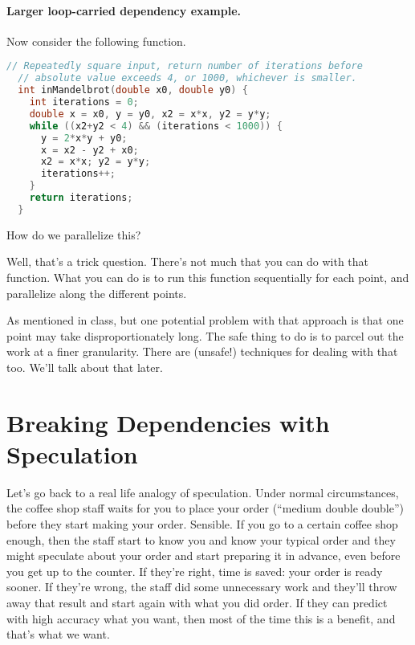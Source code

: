 \paragraph{Larger loop-carried dependency example.}
Now consider the following function.

\begin{lstlisting}[language=C]
  // Repeatedly square input, return number of iterations before 
  // absolute value exceeds 4, or 1000, whichever is smaller.
  int inMandelbrot(double x0, double y0) {
    int iterations = 0;
    double x = x0, y = y0, x2 = x*x, y2 = y*y;
    while ((x2+y2 < 4) && (iterations < 1000)) {
      y = 2*x*y + y0;
      x = x2 - y2 + x0;
      x2 = x*x; y2 = y*y;
      iterations++;
    }
    return iterations;
  }
\end{lstlisting}

How do we parallelize this?

Well, that's a trick question. There's not much that you can do with that
function. What you can do is to run this function sequentially for each
point, and parallelize along the different points.

As mentioned in class, but one potential problem with that
approach is that one point may take disproportionately long. The safe thing to do is to parcel out the work
at a finer granularity. There are
(unsafe!) techniques for dealing with that too. We'll talk about that
later.



\section*{Breaking Dependencies with Speculation}
Let's go back to a real life analogy of speculation. Under normal circumstances, the coffee shop staff waits for you to place your order (``medium double double'') before they start making your order. Sensible. If you go to a certain coffee shop enough, then the staff start to know you and know your typical order and they might speculate about your order and start preparing it in advance, even before you get up to the counter. If they're right, time is saved: your order is ready sooner. If they're wrong, the staff did some unnecessary work and they'll throw away that result and start again with what you did order. If they can predict with high accuracy what you want, then most of the time this is a benefit, and that's what we want.

